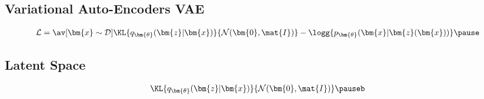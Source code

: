 \Outline %

\begin{slide}
\section[-2]{Variational Auto-Encoders VAE}

\pb
\pause{}

\begin{center}
  \pause
\end{center}
\begin{align*}
    \mathcal{L} =
  \av[\bm{x}\sim\mathcal{D}]{
  \KL{q_{\bm{\theta}}(\bm{z}|\bm{x})}{\mathcal{N}(\bm{0},\mat{I})}
  - \logg{p_{\bm{\theta}}(\bm{x}|\bm{z}(\bm{x}))}}\pause
\end{align*}
\end{slide}



\begin{slide}
\section[-2]{Latent Space}

\pb\pause{}
\begin{center}
  \pause
\end{center}
\begin{align*}
  \KL{q_{\bm{\theta}}(\bm{z}|\bm{x})}{\mathcal{N}(\bm{0},\mat{I})}\pauseb
\end{align*}
\end{slide}


